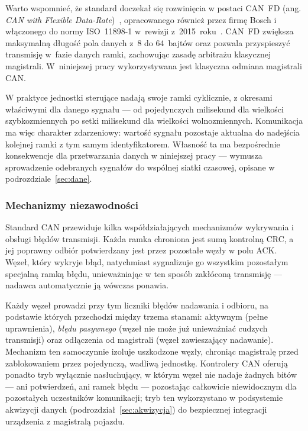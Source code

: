 Warto wspomnieć, że standard doczekał się rozwinięcia w postaci CAN~FD
(ang. \emph{CAN with Flexible Data-Rate})~\cite{boschfd2012}, opracowanego
również przez firmę Bosch i włączonego do normy ISO~11898-1
w~rewizji z~2015~roku~\cite{iso11898}. CAN~FD zwiększa maksymalną długość
pola danych z~8 do 64~bajtów oraz pozwala przyspieszyć transmisję w~fazie
danych ramki, zachowując zasadę arbitrażu klasycznej magistrali. W~niniejszej
pracy wykorzystywana jest klasyczna odmiana magistrali CAN.

W praktyce jednostki sterujące nadają swoje ramki cyklicznie, z okresami
właściwymi dla danego sygnału --- od pojedynczych milisekund dla wielkości
szybkozmiennych po setki milisekund dla wielkości wolnozmiennych. Komunikacja
ma więc charakter zdarzeniowy: wartość sygnału pozostaje aktualna do
nadejścia kolejnej ramki z tym samym identyfikatorem. Własność ta ma
bezpośrednie konsekwencje dla przetwarzania danych w niniejszej pracy ---
wymusza sprowadzenie odebranych sygnałów do wspólnej siatki czasowej,
opisane w podrozdziale~\ref{sec:dane}.

\subsubsection{Mechanizmy niezawodności}

Standard CAN przewiduje kilka współdziałających mechanizmów wykrywania
i obsługi błędów transmisji. Każda ramka chroniona jest sumą kontrolną CRC,
a jej poprawny odbiór potwierdzany jest przez pozostałe węzły w polu ACK.
Węzeł, który wykryje błąd, natychmiast sygnalizuje go wszystkim pozostałym
specjalną ramką błędu, unieważniając w ten sposób zakłóconą transmisję ---
nadawca automatycznie ją wówczas ponawia.

Każdy węzeł prowadzi przy tym liczniki błędów nadawania i odbioru,
na podstawie których przechodzi między trzema stanami: aktywnym (pełne
uprawnienia), \emph{błędu pasywnego} (węzeł nie może już unieważniać cudzych
transmisji) oraz odłączenia od magistrali (węzeł zawieszający nadawanie).
Mechanizm ten samoczynnie izoluje uszkodzone węzły, chroniąc magistralę
przed zablokowaniem przez pojedynczą, wadliwą jednostkę. Kontrolery CAN
oferują ponadto tryb wyłącznie nasłuchujący, w którym węzeł nie nadaje
żadnych bitów --- ani potwierdzeń, ani ramek błędu --- pozostając całkowicie
niewidocznym dla pozostałych uczestników komunikacji; tryb ten wykorzystano
w podsystemie akwizycji danych (podrozdział~\ref{sec:akwizycja}) do
bezpiecznej integracji urządzenia z magistralą pojazdu.

